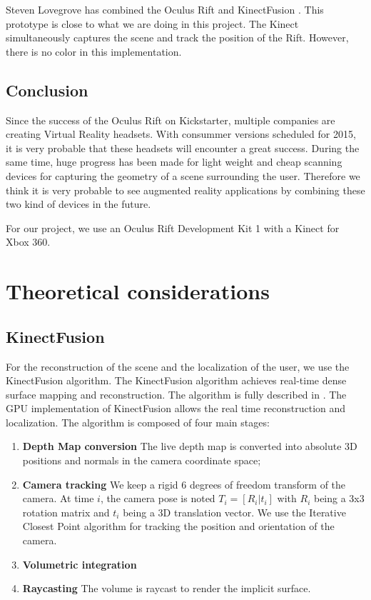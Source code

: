 \documentclass[12pt]{article}
\begin{document}
Steven Lovegrove has combined the Oculus Rift and KinectFusion \cite{OculusFusion}. This prototype is close to what we are doing in this project. The Kinect simultaneously captures the scene and track the position of the Rift. However, there is no color in this implementation.

\subsection{Conclusion}
Since the success of the Oculus Rift on Kickstarter, multiple companies are creating Virtual Reality headsets. With consummer versions scheduled for 2015, it is very probable that these headsets will encounter a great success. During the same time, huge progress has been made for light weight and cheap scanning devices for capturing the geometry of a scene surrounding the user. Therefore we think it is very probable to see augmented reality applications by combining these two kind of devices in the future.

For our project, we use an Oculus Rift Development Kit 1 with a Kinect for Xbox 360.

\newpage
\section{Theoretical considerations}
\subsection{KinectFusion}
For the reconstruction of the scene and the localization of the user, we use the KinectFusion algorithm. The KinectFusion algorithm achieves real-time dense surface mapping and reconstruction. The algorithm is fully described in \cite{KF1, KF2}. The GPU implementation of KinectFusion allows the real time reconstruction and localization. The algorithm is composed of four main stages:
\begin{enumerate}
\item \textbf{Depth Map conversion} The live depth map is converted into absolute 3D positions and normals in the camera coordinate space;
\item \textbf{Camera tracking} We keep a rigid 6 degrees of freedom transform of the camera. At time $i$, the camera pose is noted $T_i = [R_i|t_i]$ with $R_i$ being a 3x3 rotation matrix and $t_i$ being a 3D translation vector. We use the Iterative Closest Point algorithm for tracking the position and orientation of the camera.
\item \textbf{Volumetric integration}
\item \textbf{Raycasting} The volume is raycast to render the implicit surface.
\end{enumerate}
\end{document}

